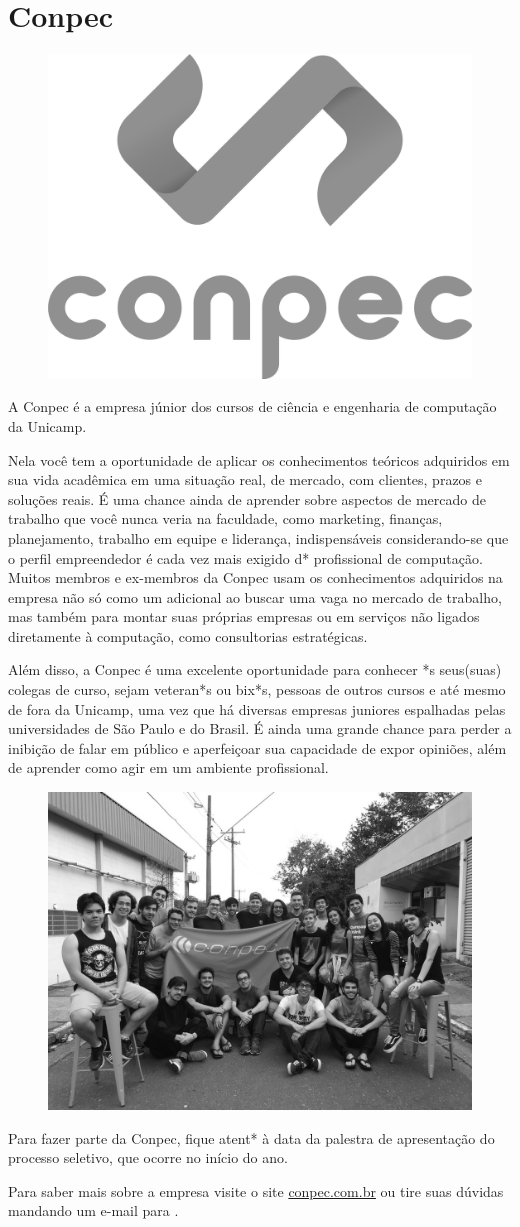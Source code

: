 
\section{Conpec}

\begin{figure}[H]
  \centering
  \includegraphics[width=.35\textwidth]{img/alem_da_graduacao/conpec_logo.png}
\end{figure}

A Conpec é a empresa júnior dos cursos de ciência e engenharia de computação da
Unicamp.

Nela você tem a oportunidade de aplicar os conhecimentos teóricos adquiridos em
sua vida acadêmica em uma situação real, de mercado, com clientes, prazos e
soluções reais. É uma chance ainda de aprender sobre aspectos de mercado de
trabalho que você nunca veria na faculdade, como marketing, finanças,
planejamento, trabalho em equipe e liderança, indispensáveis considerando-se que
o perfil empreendedor é cada vez mais exigido d* profissional de computação.
Muitos membros e ex-membros da Conpec usam os conhecimentos adquiridos na
empresa não só como um adicional ao buscar uma vaga no mercado de trabalho, mas
também para montar suas próprias empresas ou em serviços não ligados diretamente
à computação, como consultorias estratégicas.

Além disso, a Conpec é uma excelente oportunidade para conhecer *s seus(suas)
colegas de curso, sejam veteran*s ou bix*s, pessoas de outros cursos e até mesmo
de fora da Unicamp, uma vez que há diversas empresas juniores espalhadas pelas
universidades de São Paulo e do Brasil. É ainda uma grande chance para perder a
inibição de falar em público e aperfeiçoar sua capacidade de expor opiniões,
além de aprender como agir em um ambiente profissional.

\begin{figure}[H]
  \centering
  \includegraphics[width=.45\textwidth]{img/alem_da_graduacao/conpec_foto.jpg}
\end{figure}

Para fazer parte da Conpec, fique atent* à data da palestra de apresentação do
processo seletivo, que ocorre no início do ano.

Para saber mais sobre a empresa visite o site \url{conpec.com.br} ou tire suas
dúvidas mandando um e-mail para .
